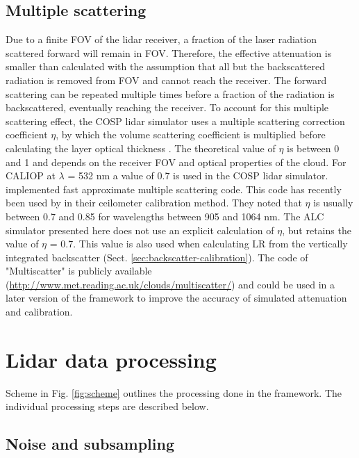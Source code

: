 \subsection{Multiple scattering}

Due to a finite FOV of the lidar receiver, a fraction of the laser
radiation scattered forward will remain in FOV. Therefore,
the effective attenuation is smaller than calculated with the assumption
that all but the backscattered radiation is removed from FOV and cannot
reach the receiver. The forward scattering can be repeated multiple times
before a fraction of the radiation is backscattered, eventually reaching the
receiver. To account for this multiple scattering effect, the COSP lidar
simulator uses a multiple scattering correction coefficient $\eta$, by
which the volume scattering coefficient is multiplied before calculating
the layer optical thickness \citep{chiriaco2006,chepfer2007,chepfer2008}.
The theoretical value of $\eta$ is between 0 and 1 and depends on the
receiver FOV and optical properties of the cloud. For CALIOP
at $\lambda$ = 532 nm a value of 0.7 is used in the COSP lidar simulator.
\cite{hogan2006} implemented fast approximate multiple
scattering code. This code has recently been used by \cite{hopkin2019} in their
ceilometer calibration method. They noted that $\eta$ is usually between
0.7 and 0.85 for wavelengths between 905 and 1064 nm. The ALC simulator
presented here does not use an explicit calculation of $\eta$, but retains 
the value of $\eta$ = 0.7. This value is also used when calculating LR
from the vertically integrated backscatter
(Sect. \ref{sec:backscatter-calibration}). The code of \cite{hogan2006}
"Multiscatter" is publicly available (\url{http://www.met.reading.ac.uk/clouds/multiscatter/}) 
and could be used in a later version of the framework to improve the
accuracy of simulated attenuation and calibration.

\section{Lidar data processing}
\label{sec:lidar-data-processing}

Scheme in Fig. \ref{fig:scheme} outlines the processing done in the framework.
The individual processing steps are described below.

\subsection{Noise and subsampling}
\label{sec:noise-and-subsampling}

